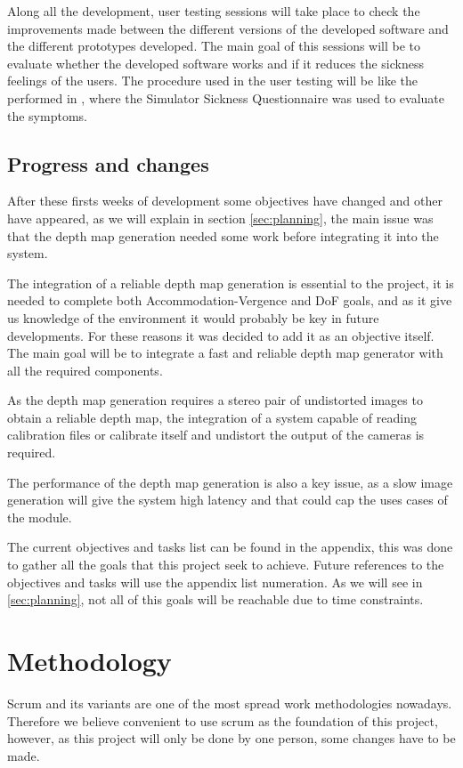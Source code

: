 \documentclass[10pt,a4paper,twocolumn,twoside]{article}
\begin{document}
	Along all the development, user testing sessions will take place to check the improvements made between the different versions of the developed software and the different prototypes developed. The main goal of this sessions will be to evaluate whether the developed software works and if it reduces the sickness feelings of the users. The procedure used in the user testing will be like the performed in \cite{ifftConfortDoF}, where the Simulator Sickness Questionnaire \cite{ssqQuestion} was used to evaluate the symptoms. 
	
	\subsection{Progress and changes}
	
	After these firsts weeks of development some objectives have changed and other have appeared, as we will explain in section \ref{sec:planning}, the main issue was that the depth map generation needed some work before integrating it into the system.
	
	The integration of a reliable depth map generation is essential to the project, it is needed to complete both Accommodation-Vergence and DoF goals, and as it give us knowledge of the environment it would probably be key in future developments. For these reasons it was decided to add it as an objective itself. The main goal will be to integrate a fast and reliable depth map generator with all the required components.
	
	As the depth map generation requires a stereo pair of undistorted images to obtain a reliable depth map, the integration of a system capable of reading calibration files or calibrate itself and undistort the output of the cameras is required.  

	The performance of the depth map generation is also a key issue, as a slow image generation will give the system high latency and that could cap the uses cases of the module. 
	
	The current objectives and tasks list can be found in the appendix, this was done to gather all the goals that this project seek to achieve. Future references to the objectives and tasks will use the appendix list numeration. As we will see in \ref{sec:planning}, not all of this goals will be reachable due to time constraints.
	
	\section{Methodology}
	Scrum and its variants are one of the most spread work methodologies nowadays. Therefore we believe convenient to use scrum as the foundation of this project, however, as this project will only be done by one person, some changes have to be made. 
	
\end{document}
